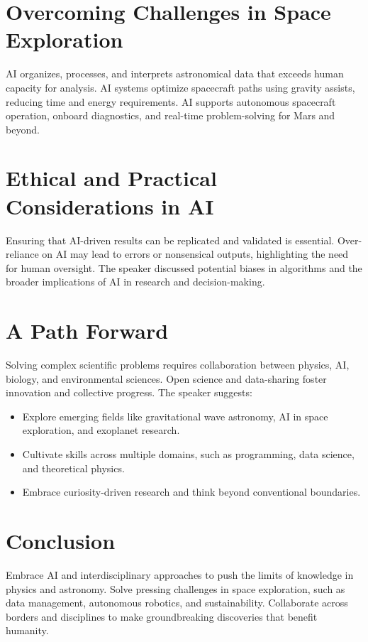 \documentclass[12pt]{article}
\begin{document}
\section{Overcoming Challenges in Space Exploration}
    AI organizes, processes, and interprets astronomical data that exceeds human capacity for analysis. AI systems optimize spacecraft paths using gravity assists, reducing time and energy requirements. AI supports autonomous spacecraft operation, onboard diagnostics, and real-time problem-solving for Mars and beyond.


\section{Ethical and Practical Considerations in AI}
    Ensuring that AI-driven results can be replicated and validated is essential. Over-reliance on AI may lead to errors or nonsensical outputs, highlighting the need for human oversight. The speaker discussed potential biases in algorithms and the broader implications of AI in research and decision-making.


\section{A Path Forward}
    Solving complex scientific problems requires collaboration between physics, AI, biology, and environmental sciences. Open science and data-sharing foster innovation and collective progress. The speaker suggests:
    \begin{itemize}
        \item Explore emerging fields like gravitational wave astronomy, AI in space exploration, and exoplanet research.
        \item Cultivate skills across multiple domains, such as programming, data science, and theoretical physics.
        \item Embrace curiosity-driven research and think beyond conventional boundaries.
    \end{itemize}

\section{Conclusion}
    Embrace AI and interdisciplinary approaches to push the limits of knowledge in physics and astronomy. Solve pressing challenges in space exploration, such as data management, autonomous robotics, and sustainability. Collaborate across borders and disciplines to make groundbreaking discoveries that benefit humanity.
\end{document}
